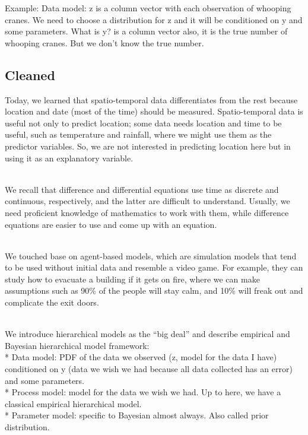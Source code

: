 \documentclass[
]{book}
\begin{document}
Example:
Data model: z is a column vector with each observation of whooping cranes. We need to choose a distribution for z and it will be conditioned on y and some parameters. What is y? is a column vector also, it is the true number of whooping cranes. But we don't know the true number.

\hypertarget{cleaned}{%
\subsection{Cleaned}\label{cleaned}}

Today, we learned that spatio-temporal data differentiates from the rest because location and date (most of the time) should be measured. Spatio-temporal data is useful not only to predict location; some data needs location and time to be useful, such as temperature and rainfall, where we might use them as the predictor variables. So, we are not interested in predicting location here but in using it as an explanatory variable.\\
\strut \\
We recall that difference and differential equations use time as discrete and continuous, respectively, and the latter are difficult to understand. Usually, we need proficient knowledge of mathematics to work with them, while difference equations are easier to use and come up with an equation.\\
\strut \\
We touched base on agent-based models, which are simulation models that tend to be used without initial data and resemble a video game. For example, they can study how to evacuate a building if it gets on fire, where we can make assumptions such as 90\% of the people will stay calm, and 10\% will freak out and complicate the exit doors.\\
\strut \\
We introduce hierarchical models as the ``big deal'' and describe empirical and Bayesian hierarchical model framework:\\
* Data model: PDF of the data we observed (z, model for the data I have) conditioned on y (data we wish we had because all data collected has an error) and some parameters.\\
* Process model: model for the data we wish we had. Up to here, we have a classical empirical hierarchical model.\\
* Parameter model: specific to Bayesian almost always. Also called prior distribution.\\
\end{document}
